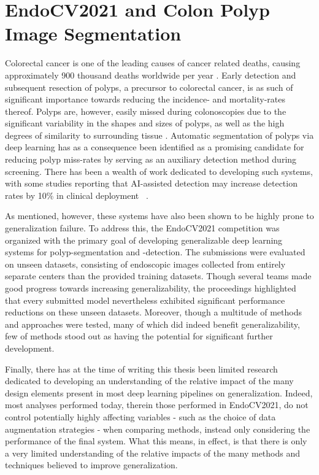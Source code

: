     \section{EndoCV2021 and Colon Polyp Image Segmentation}   
    Colorectal cancer is one of the leading causes of cancer related deaths, causing approximately 900 thousand deaths worldwide per year \cite{colorectal_cancer}. Early detection and subsequent resection of polyps, a precursor to colorectal cancer, is as such of significant importance towards reducing the incidence- and mortality-rates thereof. Polyps are, however, easily missed during colonoscopies due to the significant variability in the shapes and sizes of polyps, as well as the high degrees of similarity to surrounding tissue \cite{missrate1, missrate2}. 
    Automatic segmentation of polyps via deep learning has as a consequence been identified as a promising candidate for reducing polyp miss-rates by serving as an auxiliary detection method during screening. There has been a wealth of work dedicated to developing such systems, with some studies reporting that AI-assisted detection may increase detection rates by 10\% in clinical deployment ~\cite{polyp-success-story}.  
    
    As mentioned, however, these systems have also been shown to be highly prone to generalization failure. To address this, the EndoCV2021 competition was organized with the primary goal of developing generalizable deep learning systems for polyp-segmentation and -detection. The submissions were evaluated on unseen datasets, consisting of endoscopic images collected from entirely separate centers than the provided training datasets. Though several teams made good progress towards increasing generalizability, the proceedings highlighted that every submitted model nevertheless exhibited significant performance reductions on these unseen datasets. Moreover, though a multitude of methods and approaches were tested, many of which did indeed benefit generalizability, few of methods stood out as having the potential for significant further development.

    Finally, there has at the time of writing this thesis been limited research dedicated to developing an understanding of the relative impact of the many design elements present in most deep learning pipelines on generalization. Indeed, most analyses performed today, therein those performed in EndoCV2021, do not control potentially highly affecting variables - such as the choice of data augmentation strategies -  when comparing methods, instead only considering the performance of the final system. What this means, in effect, is that there is only a very limited understanding of the relative impacts of the many methods and techniques believed to improve generalization.  
    
